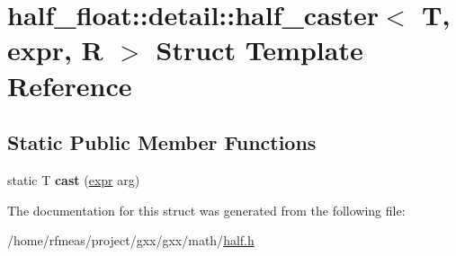 \hypertarget{structhalf__float_1_1detail_1_1half__caster_3_01T_00_01expr_00_01R_01_4}{}\section{half\+\_\+float\+:\+:detail\+:\+:half\+\_\+caster$<$ T, expr, R $>$ Struct Template Reference}
\label{structhalf__float_1_1detail_1_1half__caster_3_01T_00_01expr_00_01R_01_4}
\subsection*{Static Public Member Functions}
\begin{DoxyCompactItemize}
\item 
static T {\bfseries cast} (\hyperlink{structhalf__float_1_1detail_1_1expr}{expr} arg)\hypertarget{structhalf__float_1_1detail_1_1half__caster_3_01T_00_01expr_00_01R_01_4_a8952ef178ea8fcc5faa71b7d6571dcd2}{}\label{structhalf__float_1_1detail_1_1half__caster_3_01T_00_01expr_00_01R_01_4_a8952ef178ea8fcc5faa71b7d6571dcd2}

\end{DoxyCompactItemize}


The documentation for this struct was generated from the following file\+:\begin{DoxyCompactItemize}
\item 
/home/rfmeas/project/gxx/gxx/math/\hyperlink{half_8h}{half.\+h}\end{DoxyCompactItemize}
